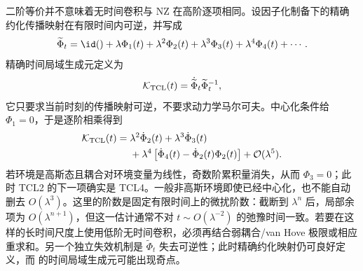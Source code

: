 二阶等价并不意味着无时间卷积与 NZ 在高阶逐项相同。设因子化制备下的精确约化传播映射在有限时间内可逆，并写成
\begin{equation}
\widetilde\Phi_t
=\id()+\lambda\Phi_1(t)+\lambda^2\Phi_2(t)
+\lambda^3\Phi_3(t)+\lambda^4\Phi_4(t)+\cdots .
\label{eq:phys-oqs-map-perturbative-expansion}
\end{equation}
精确时间局域生成元定义为
\begin{equation}
\mathcal K_{\rm TCL}(t)=\dot{\widetilde\Phi}_t\widetilde\Phi_t^{-1},
\label{eq:phys-oqs-exact-tcl-generator}
\end{equation}
它只要求当前时刻的传播映射可逆，不要求动力学马尔可夫。中心化条件给 $\Phi_1=0$，于是逐阶相乘得到
\begin{equation}
\begin{aligned}
\mathcal K_{\rm TCL}(t)
={}&\lambda^2\dot\Phi_2(t)
+\lambda^3\dot\Phi_3(t)\\
&+\lambda^4\left[\dot\Phi_4(t)-\dot\Phi_2(t)\Phi_2(t)\right]
+\mathcal O(\lambda^5).
\end{aligned}
\label{eq:phys-oqs-tcl-through-fourth-order}
\end{equation}
若环境是高斯态且耦合对环境变量为线性，奇数阶累积量消失，从而 $\Phi_3=0$；此时 TCL2 的下一项确实是 TCL4。一般非高斯环境即使已经中心化，也不能自动删去 $O(\lambda^3)$。这里的阶数是固定有限时间上的微扰阶数：截断到 $\lambda^n$ 后，局部余项为 $O(\lambda^{n+1})$，但这一估计通常不对 $t\sim O(\lambda^{-2})$ 的弛豫时间一致。若要在这样的长时间尺度上使用低阶无时间卷积，必须再结合弱耦合/van Hove 极限或相应重求和。另一个独立失效机制是 $\widetilde\Phi_t$ 失去可逆性；此时精确约化映射仍可良好定义，而 的时间局域生成元可能出现奇点。

